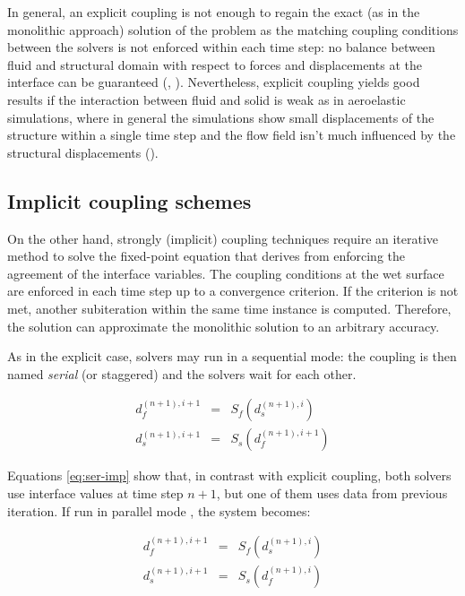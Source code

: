 In general, an explicit coupling is not enough to regain the exact (as in the monolithic approach) solution of the problem as the matching coupling conditions between the solvers is not enforced within each time step: no balance between fluid and structural domain with respect to forces and displacements at the interface can be guaranteed (\cite{hou2012numerical}, \cite{degroote2009performance}). Nevertheless, explicit coupling yields good results if the interaction between fluid and solid is weak as in aeroelastic simulations, where in general the simulations show small displacements of the structure within a single time step and the flow field isn't much influenced by the structural displacements (\cite{farhat2006provably}).

\subsection{Implicit coupling schemes}
\label{subsec:implicit}

On the other hand, strongly (implicit) coupling techniques require an iterative method to solve the fixed-point equation that derives from enforcing the agreement of the interface variables.
The coupling conditions at the wet surface are enforced in each time step up to a convergence criterion. If the criterion is not met, another subiteration within the same time instance is computed. Therefore, the solution can approximate the monolithic solution to an arbitrary accuracy.

As in the explicit case, solvers may run in a sequential mode: the coupling is then named \textit{serial} (or staggered) and the solvers wait for each other. 

\begin{subequations}
	\begin{eqnarray}
		d_f^{(n+1),i+1} &=& S_f\left(d_s^{(n+1),i}\right) \\
		d_s^{(n+1),i+1} &=& S_s\left( d_f^{(n+1),i+1} \right)
	\end{eqnarray} 
	\label{eq:ser-imp}
\end{subequations}

Equations \ref{eq:ser-imp} show that, in contrast with explicit coupling, both solvers use interface values at time step $n+1$, but one of them uses data from previous iteration.
If run in parallel mode \cite{mehl2016parallel}, the system becomes:

\begin{subequations}
	\begin{eqnarray}
		d_f^{(n+1),i+1} &=& S_f\left(d_s^{(n+1),i}\right) \\
		d_s^{(n+1),i+1} &=& S_s\left( d_f^{(n+1),i} \right)
	\end{eqnarray} 
	\label{eq:par-imp}
\end{subequations}

